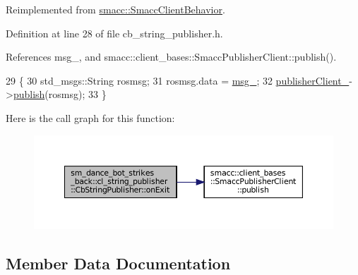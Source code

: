 Reimplemented from \hyperlink{classsmacc_1_1SmaccClientBehavior_a7e4fb6ce81ff96dc172425852d69c0c5}{smacc\+::\+Smacc\+Client\+Behavior}.



Definition at line 28 of file cb\+\_\+string\+\_\+publisher.\+h.



References msg\+\_\+, and smacc\+::client\+\_\+bases\+::\+Smacc\+Publisher\+Client\+::publish().


\begin{DoxyCode}
29     \{
30         std\_msgs::String rosmsg;
31         rosmsg.data = \hyperlink{classsm__dance__bot__strikes__back_1_1cl__string__publisher_1_1CbStringPublisher_aff05ac35bd920ef24fd9b6464fe83eae}{msg\_};
32         \hyperlink{classsm__dance__bot__strikes__back_1_1cl__string__publisher_1_1CbStringPublisher_afdbdb3c725b013af9f30fc04d7ab458b}{publisherClient\_}->\hyperlink{classsmacc_1_1client__bases_1_1SmaccPublisherClient_a083abb0f5c0f587f3381a58fe1fe3669}{publish}(rosmsg);
33     \}
\end{DoxyCode}
Here is the call graph for this function\+:
\nopagebreak
\begin{figure}[H]
\begin{center}
\leavevmode
\includegraphics[width=350pt]{classsm__dance__bot__strikes__back_1_1cl__string__publisher_1_1CbStringPublisher_ae4aa02553119822c583bb2abb44c810c_cgraph}
\end{center}
\end{figure}


\subsection{Member Data Documentation}
\mbox{\label{classsm__dance__bot__strikes__back_1_1cl__string__publisher_1_1CbStringPublisher_aff05ac35bd920ef24fd9b6464fe83eae}} 
